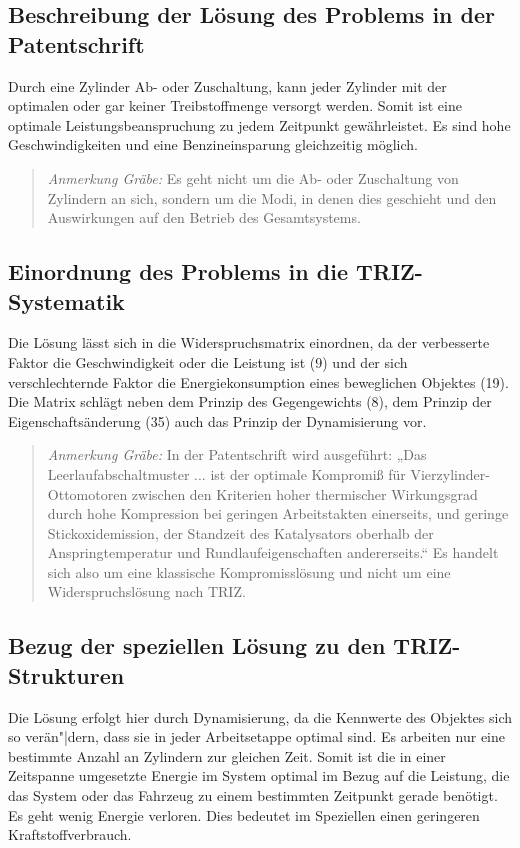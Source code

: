 \documentclass[11pt,a4paper]{article}
\newcommand{\HGG}[1]{\begin{quote} \emph{Anmerkung Gräbe:} #1  \end{quote}}
\begin{document}
\subsection{Beschreibung der Lösung des Problems in der Patentschrift}
Durch eine Zylinder Ab- oder Zuschaltung, kann jeder Zylinder mit der
optimalen oder gar keiner Treibstoffmenge versorgt werden.  Somit ist eine
optimale Leistungsbeanspruchung zu jedem Zeitpunkt gewährleistet.  Es sind
hohe Geschwindigkeiten und eine Benzineinsparung gleichzeitig möglich.

\HGG{Es geht nicht um die  Ab- oder Zuschaltung von Zylindern an sich, sondern
um die Modi, in denen dies geschieht und den Auswirkungen auf den Betrieb des
Gesamtsystems. }

\subsection{Einordnung des Problems in die TRIZ-Systematik}
Die Lösung lässt sich in die Widerspruchsmatrix einordnen, da der verbesserte
Faktor die Geschwindigkeit oder die Leistung ist (9) und der sich
verschlechternde Faktor die Energiekonsumption eines beweglichen Objektes
(19). Die Matrix schlägt neben dem Prinzip des Gegengewichts (8), dem Prinzip
der Eigenschaftsänderung (35) auch das Prinzip der Dynamisierung vor.

\HGG{In der Patentschrift wird ausgeführt: „Das Leerlaufabschaltmuster ... ist
  der optimale Kompromiß für Vierzylinder-Ottomotoren zwischen den Kriterien
  hoher thermischer Wirkungsgrad durch hohe Kompression bei geringen
  Arbeitstakten einerseits, und geringe Stickoxidemission, der Standzeit des
  Katalysators oberhalb der Anspringtemperatur und Rundlaufeigenschaften
  andererseits.“ Es handelt sich also um eine klassische Kompromisslösung und
  nicht um eine Widerspruchslösung nach TRIZ.}

\subsection{Bezug der speziellen Lösung zu den TRIZ-Strukturen}
 
Die Lösung erfolgt hier durch Dynamisierung, da die Kennwerte des Objektes
sich so verän"|dern, dass sie in jeder Arbeitsetappe optimal sind. Es arbeiten
nur eine bestimmte Anzahl an Zylindern zur gleichen Zeit. Somit ist die in
einer Zeitspanne umgesetzte Energie im System optimal im Bezug auf die
Leistung, die das System oder das Fahrzeug zu einem bestimmten Zeitpunkt
gerade benötigt. Es geht wenig Energie verloren. Dies bedeutet im Speziellen
einen geringeren Kraftstoffverbrauch.
\end{document}
